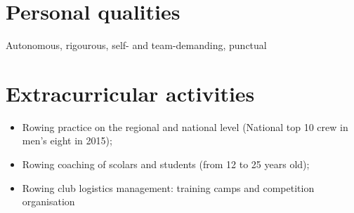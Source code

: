 \documentclass[letter,10pt]{article} %
\begin{document}
\section{Personal qualities}

Autonomous, rigourous, self- and team-demanding, punctual

\section{Extracurricular activities}

\begin{itemize}
\item Rowing practice on the regional and national level (National top 10 crew
in men's eight in 2015);
\item Rowing coaching of scolars and students (from 12 to 25 years old);
\item Rowing club logistics management: training camps and competition
organisation 
\end{itemize}

\end{document}
